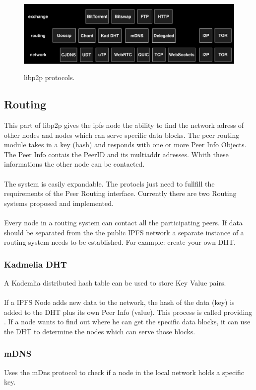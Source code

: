 \documentclass[a4paper,11pt, oneside]{report}
\theoremstyle{definition}
\begin{document}
\begin{figure}[H]
\centering
\includegraphics[width=\textwidth]{img/libp2p-protocols.png}\\[0.8cm]
\caption[libp2p]{libp2p protocols.}
\end{figure}
\subsection{Routing}
This part of libp2p gives the ipfs node the ability to find the network adress of other nodes and nodes which can serve specific data blocks.  The peer routing module takes in a key (hash) and responds with one or more Peer Info Objects. The Peer Info contais the PeerID and its multiaddr adresses. Whith these informations the other node can be contacted.\\ \\
The system is easily expandable. The protocls just need to fullfill the requirements of the Peer Routing interface. Currently there are two Routing systems proposed and implemented.\\ \\
Every node in a routing system can contact all the participating peers. If data should be separated from the the public IPFS network a separate instance of a routing system needs to be established. For example: create your own DHT.

\subsubsection{Kadmelia DHT}
A Kademlia distributed hash table can be used to store Key Value pairs.\\ \\
If a IPFS Node adds new data to the network, the hash of the data (key) is added to the DHT plus its own Peer Info (value). This process is called providing \cite{dht-provide}. If a node wants to find out where he can get the specific data blocks, it can use the DHT to determine the nodes which can serve those blocks.

\subsubsection{mDNS}
Uses the mDns protocol to check if a node in the local network holds a specific key.
\end{document}
